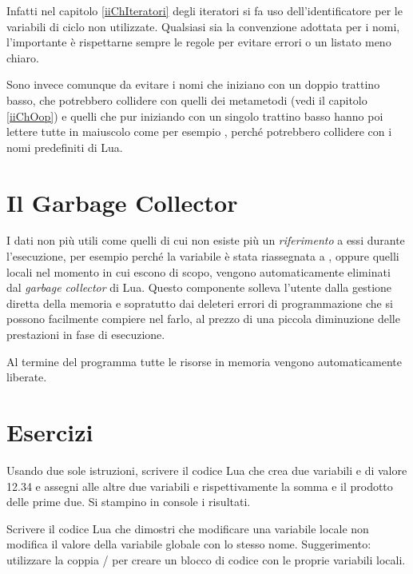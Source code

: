 Infatti nel capitolo \ref{iiChIteratori} degli iteratori si fa uso
dell'identificatore  per le variabili di ciclo non utilizzate.
Qualsiasi sia la convenzione adottata per i nomi, l'importante è rispettarne
sempre le regole per evitare errori o un listato meno chiaro.

Sono invece comunque da evitare i nomi che iniziano con un doppio trattino
basso, che potrebbero collidere con quelli dei metametodi (vedi il capitolo
\ref{iiChOop}) e quelli che pur iniziando con un singolo trattino basso hanno
poi lettere tutte in maiuscolo come per esempio
, perché potrebbero collidere con i nomi
predefiniti di Lua.


\section{Il Garbage Collector}

I dati non più utili come quelli di cui non esiste più un \emph{riferimento} a
essi durante l'esecuzione, per esempio perché la variabile è stata riassegnata a
, oppure quelli locali nel momento in cui escono di scopo, vengono
automaticamente eliminati dal \emph{garbage collector} di Lua. Questo componente
solleva l'utente dalla gestione diretta della memoria e sopratutto dai deleteri
errori di programmazione che si possono facilmente compiere nel farlo, al prezzo
di una piccola diminuzione delle prestazioni in fase di esecuzione.

Al termine del programma tutte le risorse in memoria vengono automaticamente
liberate.


\section{Esercizi}

\begin{Exercise}[label=fond-01]
Usando due sole istruzioni, scrivere il codice Lua che crea due variabili
 e  di valore 12.34 e assegni alle altre due variabili  e
 rispettivamente la somma e il prodotto delle prime due. Si stampino
in console i risultati.
\end{Exercise}

\begin{Exercise}[label=fond-02]
Scrivere il codice Lua che dimostri che modificare una variabile locale non
modifica il valore della variabile globale con lo stesso nome. Suggerimento:
utilizzare la coppia / per creare un blocco di codice con le
proprie variabili locali.
\end{Exercise}

